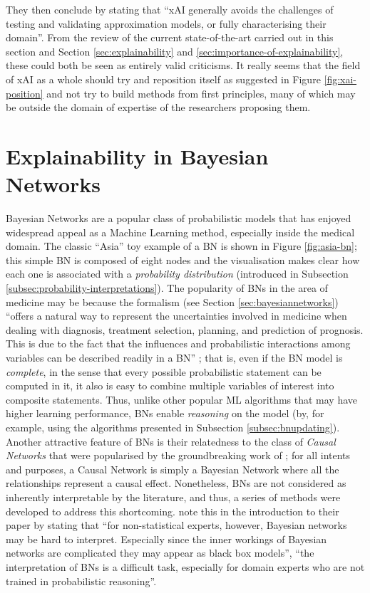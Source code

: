 They then conclude by stating that \enquote{xAI generally avoids the challenges of testing and validating approximation models, or fully characterising their domain}.
From the review of the current state-of-the-art carried out in this section and Section \ref{sec:explainability} and \ref{sec:importance-of-explainability}, these could both be seen as entirely valid criticisms.
It really seems that the field of xAI as a whole should try and reposition itself as suggested in Figure \ref{fig:xai-position} and not try to build methods from first principles, many of which may be outside the domain of expertise of the researchers proposing them.

\section{Explainability in Bayesian Networks} \label{sec:explainability-in-bayesian-networks}
Bayesian Networks are a popular class of probabilistic models that has enjoyed widespread appeal as a Machine Learning method, especially inside the medical domain.
The classic \enquote{Asia} toy example of a BN is shown in Figure \ref{fig:asia-bn}; this simple BN is composed of eight nodes and the visualisation makes clear how each one is associated with a \textit{probability distribution} (introduced in Subsection \ref{subsec:probability-interpretations}).
The popularity of BNs in the area of medicine may be because the formalism (see Section \ref{sec:bayesiannetworks}) \enquote{offers a natural way to represent the uncertainties involved in medicine when dealing with diagnosis, treatment selection, planning, and prediction of prognosis. 
This is due to the fact that the influences and probabilistic interactions among variables can be described readily in a BN} \citep{Lucas2001}; that is, even if the BN model is \textit{complete}, in the sense that every possible probabilistic statement can be computed in it, it also is easy to combine multiple variables of interest into composite statements.
Thus, unlike other popular ML algorithms that may have higher learning performance, BNs enable \textit{reasoning} on the model (by, for example, using the algorithms presented in Subsection \ref{subsec:bnupdating}).
Another attractive feature of BNs is their relatedness to the class of \textit{Causal Networks} that were popularised by the groundbreaking work of \citet{Pearl1988}; for all intents and purposes, a Causal Network is simply a Bayesian Network where all the relationships represent a causal effect.
Nonetheless, BNs are not considered as inherently interpretable by the literature, and thus, a series of methods were developed to address this shortcoming.
\citet{timmer2015explaining} note this in the introduction to their paper by stating that \enquote{for non-statistical experts, however, Bayesian networks may be hard to interpret. Especially since the inner workings of Bayesian networks are complicated they may appear as black box models}, \enquote{the interpretation of BNs is a difficult task, especially for domain experts who are not trained in probabilistic reasoning}.

